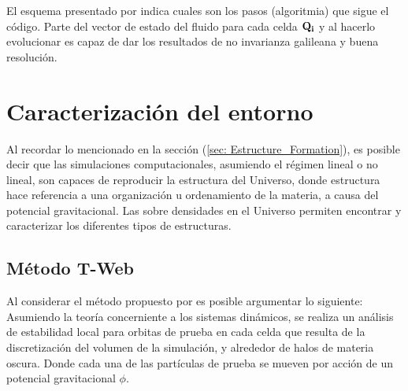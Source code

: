 El esquema presentado por \cite{springel2010} indica cuales son los pasos (algoritmia) que sigue el código. Parte del vector de estado del fluido para cada celda ${\bf{Q_{i}}}$ y al hacerlo evolucionar es capaz de dar los resultados de no invarianza galileana y buena resolución. 

\section{Caracterización del entorno}
\label{sec: Caracterizacion entorno}

Al recordar lo mencionado en la sección (\ref{sec: Estructure_Formation}), es posible decir que las simulaciones computacionales, asumiendo el régimen lineal o no lineal, son capaces de reproducir la estructura del Universo, donde estructura hace referencia a una organización u ordenamiento de la materia, a causa del potencial gravitacional. Las sobre densidades en el Universo permiten encontrar y caracterizar los diferentes tipos de estructuras.

    \subsection{Método T-Web}
    \label{subsec: Metodo_T-web}
Al considerar el método propuesto por \cite{hahn2007} es posible argumentar lo siguiente: Asumiendo la teoría concerniente a los sistemas dinámicos, se realiza un análisis de estabilidad local para orbitas de prueba en cada celda que resulta de la discretización del volumen de la simulación, y alrededor de halos de materia oscura. Donde cada una de las partículas de prueba se mueven por acción de un potencial gravitacional $\phi$.

